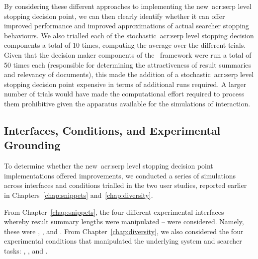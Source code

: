 By considering these different approaches to implementing the new~\gls{acr:serp} level stopping decision point, we can then clearly identify whether it can offer improved performance and improved approximations of actual searcher stopping behaviours. We also trialled each of the stochastic~\gls{acr:serp} level stopping decision components a total of 10 times, computing the average over the different trials. Given that the decision maker components of the \simiir~framework were run a total of 50 times each (responsible for determining the attractiveness of result summaries and relevancy of documents), this made the addition of a stochastic~\gls{acr:serp} level stopping decision point expensive in terms of additional runs required. A larger number of trials would have made the computational effort required to process them prohibitive given the apparatus available for the simulations of interaction.

\subsection{Interfaces, Conditions, and Experimental Grounding}\label{sec:serp:method:probscosts}
To determine whether the new~\gls{acr:serp} level stopping decision point implementations offered improvements, we conducted a series of simulations across interfaces and conditions trialled in the two user studies, reported earlier in Chapters~\ref{chap:snippets} and~\ref{chap:diversity}.

From Chapter~\ref{chap:snippets}, the four different experimental interfaces -- whereby result summary lengths were manipulated -- were considered. Namely, these were , ,  and . From Chapter~\ref{chap:diversity}, we also considered the four experimental conditions that manipulated the underlying system and searcher tasks: , ,  and .

